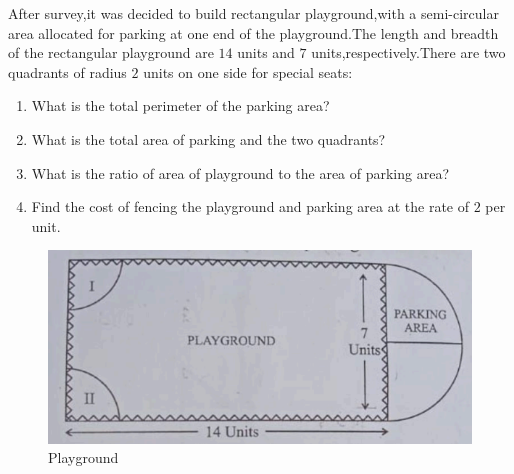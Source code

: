     After survey,it was decided to build rectangular playground,with a semi-circular area allocated for parking at one end of the playground.The length and breadth of the rectangular playground are $14$ units and $7$ units,respectively.There are two quadrants of radius $2$ units on one side for special seats:
            \begin{enumerate}
                \item What is the total perimeter of the parking area?
                \item What is the total area of parking and the two quadrants?
                \item What is the ratio of area of playground to the area of parking area?
                \item Find the cost of fencing the playground and parking area at the rate of \rupee $2$ per unit.
            \end{enumerate}
    \begin{figure}[!ht]
        \centering
        \includegraphics[width=\columnwidth]{figs/30-4-3-question36.png}
        \caption{Playground}
        \label{fig:enter-label2}
    \end{figure}
%
